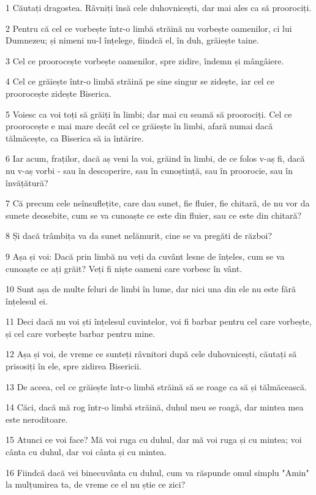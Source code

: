 \par 1 Căutați dragostea. Râvniți însă cele duhovnicești, dar mai ales ca să proorociți.
\par 2 Pentru că cel ce vorbește într-o limbă străină nu vorbește oamenilor, ci lui Dumnezeu; și nimeni nu-l înțelege, fiindcă el, în duh, grăiește taine.
\par 3 Cel ce proorocește vorbește oamenilor, spre zidire, îndemn și mângâiere.
\par 4 Cel ce grăiește într-o limbă străină pe sine singur se zidește, iar cel ce proorocește zidește Biserica.
\par 5 Voiesc ca voi toți să grăiți în limbi; dar mai cu seamă să proorociți. Cel ce proorocește e mai mare decât cel ce grăiește în limbi, afară numai dacă tălmăcește, ca Biserica să ia întărire.
\par 6 Iar acum, fraților, dacă aș veni la voi, grăind în limbi, de ce folos v-aș fi, dacă nu v-aș vorbi - sau în descoperire, sau în cunoștință, sau în proorocie, sau în învățătură?
\par 7 Că precum cele neînsuflețite, care dau sunet, fie fluier, fie chitară, de nu vor da sunete deosebite, cum se va cunoaște ce este din fluier, sau ce este din chitară?
\par 8 Și dacă trâmbița va da sunet nelămurit, cine se va pregăti de război?
\par 9 Așa și voi: Dacă prin limbă nu veți da cuvânt lesne de înțeles, cum se va cunoaște ce ați grăit? Veți fi niște oameni care vorbesc în vânt.
\par 10 Sunt așa de multe feluri de limbi în lume, dar nici una din ele nu este fără înțelesul ei.
\par 11 Deci dacă nu voi ști înțelesul cuvintelor, voi fi barbar pentru cel care vorbește, și cel care vorbește barbar pentru mine.
\par 12 Așa și voi, de vreme ce sunteți râvnitori după cele duhovnicești, căutați să prisosiți în ele, spre zidirea Bisericii.
\par 13 De aceea, cel ce grăiește într-o limbă străină să se roage ca să și tălmăcească.
\par 14 Căci, dacă mă rog într-o limbă străină, duhul meu se roagă, dar mintea mea este neroditoare.
\par 15 Atunci ce voi face? Mă voi ruga cu duhul, dar mă voi ruga și cu mintea; voi cânta cu duhul, dar voi cânta și cu mintea.
\par 16 Fiindcă dacă vei binecuvânta cu duhul, cum va răspunde omul simplu "Amin" la mulțumirea ta, de vreme ce el nu știe ce zici?
